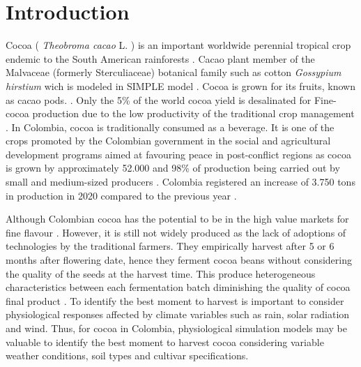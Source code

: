 \documentclass[gene,journal,article,submit,moreauthors,pdftex]{Definitions/mdpi}
\begin{document}

\section{Introduction}

Cocoa ( \textit{Theobroma cacao }L. ) is an important worldwide perennial tropical crop endemic to the South American rainforests \citep{zuidema2005, motamayor2002, argout2011, Rodriguez2019}. Cacao plant member of the Malvaceae (formerly Sterculiaceae)  botanical family such as  cotton \textit{ Gossypium hirstium} \citep{Nix2017cotton} wich is modeled in SIMPLE model \citep{Zao2019simple}. Cocoa is grown for its fruits, known as cacao pods.  \citep{ Niemenak2010, suarez2021}. Only the 5\% of the world cocoa yield is desalinated for Fine-cocoa production due to the low productivity of  the traditional crop management \citep{argout2011}.  In Colombia, cocoa  is  traditionally  consumed  as  a  beverage. It is one of the crops promoted by the Colombian government in the social and agricultural development  programs aimed at favouring peace in post-conflict regions \citep{Rodriguez2019, Abbott2019} as cocoa is grown by approximately 52.000 \citep{Gutierrez2020} and 98\% of production being carried out by small and medium-sized producers \citep{Garcia2014, Escobar2020}. Colombia registered an increase of 3.750 tons in production in 2020 compared to the previous year \citep{lamos2020}. 

Although Colombian cocoa has the potential to be in the high value markets for fine flavour \citep{Escobar2020}. However, it is still not widely produced as the lack of adoptions of technologies by the traditional farmers. They empirically harvest after 5 or 6 months after flowering date, hence they ferment cocoa beans without considering the  quality of the seeds at the harvest time. This produce heterogeneous characteristics between each fermentation batch diminishing the quality of cocoa final product \citep{Escobar2021}. To identify the best moment to harvest is important to consider physiological responses affected by climate variables such as rain, solar radiation and wind.  Thus,  for cocoa in Colombia, physiological simulation models may be valuable to identify the best moment to harvest cocoa considering variable weather conditions, soil types and cultivar specifications. 
\end{document}
